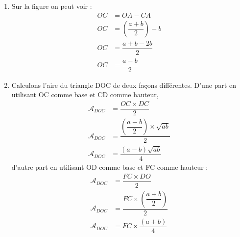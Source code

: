 \begin{enumerate}[label=C\arabic*)]
	\item Sur la figure on peut voir : 
		\begin{align*}
			OC &= OA - CA\\
			OC &= \left( \dfrac{a + b}{2} \right) - b\\
			OC &= \dfrac{a + b - 2b}{2}\\
			OC &= \dfrac{a - b}{2}
		\end{align*}
	\item Calculons l'aire du triangle DOC de deux façons différentes. 
		D'une part en utilisant OC comme base et CD comme hauteur, 
		\begin{align*}
			\mathcal{A}_{DOC} &= \dfrac{OC\times DC}{2}\\
			\mathcal{A}_{DOC} &= \dfrac{\left(\dfrac{a - b}{2}\right)\times \sqrt{ab}}{2} \\
			\mathcal{A}_{DOC} &= \dfrac{(a - b)\sqrt{ab}}{4}
		\end{align*}
		d'autre part en utilisant OD comme base et FC comme hauteur :
		\begin{align*}
			\mathcal{A}_{DOC} &= \dfrac{FC\times DO}{2}\\
			\mathcal{A}_{DOC} &= \dfrac{FC\times \left(\dfrac{a + b}{2}\right)}{2} \\
			\mathcal{A}_{DOC} &= FC\times \dfrac{(a + b)}{4}
		\end{align*}
		

\end{enumerate}
